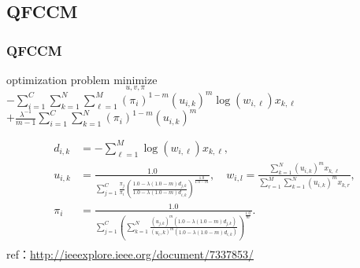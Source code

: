 \documentclass[fleqn,dvipdfmx,10pt]{beamer}
\begin{document}
\subsection{QFCCM}
\begin{frame}\frametitle{QFCCM}%
  \begin{block}{optimization problem}
    $\underset{u,v,\pi}{\text{minimize}}$
    $-\sum_{i=1}^C\sum_{k=1}^N\sum_{\ell=1}^M(\pi_i)^{1-m}(u_{i,k})^m\log(w_{i,\ell})x_{k,\ell}$\\
    $+\frac{\lambda^{-1}}{m-1}\sum_{i=1}^C\sum_{k=1}^N (\pi_i)^{1-m}(u_{i,k})^m$\centering\\
  \end{block}
  \begin{align*}
    d_{i,k}&=-\sum_{\ell=1}^M\log(w_{i,\ell})x_{k,\ell},\\
    u_{i,k}&=\frac{1.0}{\sum_{j=1}^C\frac{\pi_{j}}{\pi_{i}}\left(\frac{1.0-\lambda(1.0-m)d_{j,k}}{1.0-\lambda(1.0-m)d_{i,k}}\right)^{\frac{1.0}{1.0-m}}},\quad
    w_{i,l}=\frac{\sum_{k=1}^N (u_{i,k})^m x_{k,\ell}}{\sum_{r=1}^M\sum_{k=1}^N(u_{i,k})^m x_{k,r}},\\
    \pi_{i}&=\frac{1.0}{\sum_{j=1}^C\left(\sum_{k=1}^N\frac{(u_{j,k})^m(1.0-\lambda(1.0-m)d_{j,k})}{(u_i,k)^m(1.0-\lambda(1.0-m)d_{i,k})}\right)^{\frac{1.0}{m}}}.\\
  \end{align*}
  ref：\url{http://ieeexplore.ieee.org/document/7337853/}\centering
\end{frame}
\end{document}
